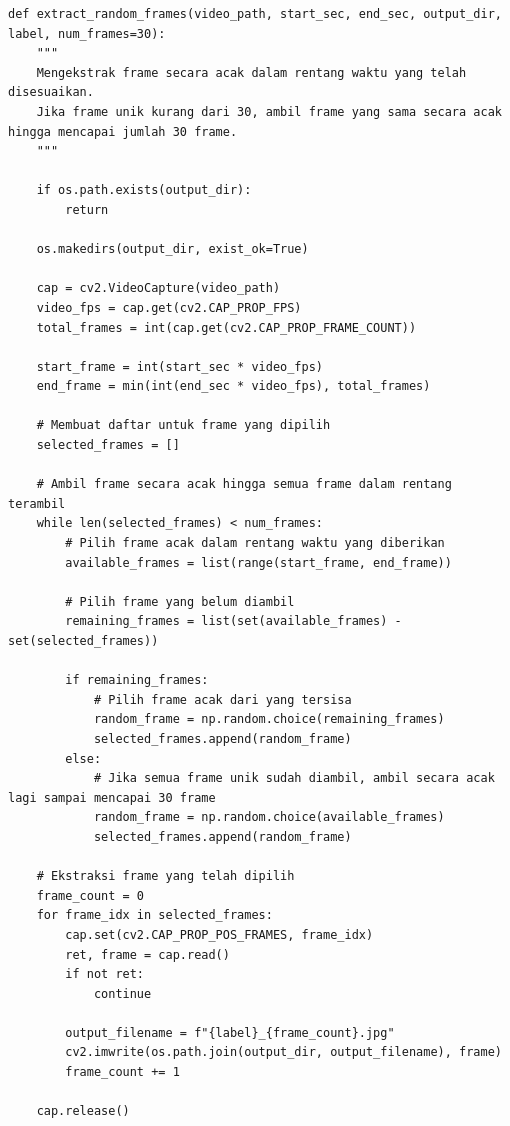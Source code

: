 

\begin{lstlisting}[caption={Ekstrak frame acak}, label={kode:ekstrak random}]
def extract_random_frames(video_path, start_sec, end_sec, output_dir, label, num_frames=30):
    """
    Mengekstrak frame secara acak dalam rentang waktu yang telah disesuaikan.
    Jika frame unik kurang dari 30, ambil frame yang sama secara acak hingga mencapai jumlah 30 frame.
    """
    
    if os.path.exists(output_dir):
        return
    
    os.makedirs(output_dir, exist_ok=True)
    
    cap = cv2.VideoCapture(video_path)
    video_fps = cap.get(cv2.CAP_PROP_FPS)
    total_frames = int(cap.get(cv2.CAP_PROP_FRAME_COUNT))
    
    start_frame = int(start_sec * video_fps)
    end_frame = min(int(end_sec * video_fps), total_frames)
    
    # Membuat daftar untuk frame yang dipilih
    selected_frames = []
    
    # Ambil frame secara acak hingga semua frame dalam rentang terambil
    while len(selected_frames) < num_frames:
        # Pilih frame acak dalam rentang waktu yang diberikan
        available_frames = list(range(start_frame, end_frame))
        
        # Pilih frame yang belum diambil
        remaining_frames = list(set(available_frames) - set(selected_frames))
        
        if remaining_frames:
            # Pilih frame acak dari yang tersisa
            random_frame = np.random.choice(remaining_frames)
            selected_frames.append(random_frame)
        else:
            # Jika semua frame unik sudah diambil, ambil secara acak lagi sampai mencapai 30 frame
            random_frame = np.random.choice(available_frames)
            selected_frames.append(random_frame)
    
    # Ekstraksi frame yang telah dipilih
    frame_count = 0
    for frame_idx in selected_frames:
        cap.set(cv2.CAP_PROP_POS_FRAMES, frame_idx)
        ret, frame = cap.read()
        if not ret:
            continue
        
        output_filename = f"{label}_{frame_count}.jpg"
        cv2.imwrite(os.path.join(output_dir, output_filename), frame)
        frame_count += 1
    
    cap.release()
\end{lstlisting}

